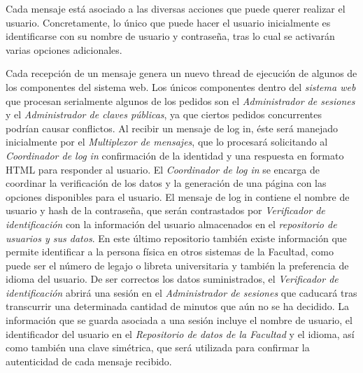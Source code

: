 Cada mensaje está asociado a las diversas acciones que puede querer realizar el usuario. Concretamente, lo único que puede hacer el usuario inicialmente es identificarse con su nombre de usuario y contraseña, tras lo cual se activarán varias opciones adicionales.


Cada recepción de un mensaje genera un nuevo thread de ejecución de algunos de los componentes del sistema web. Los únicos componentes dentro del \emph{sistema web} que procesan serialmente algunos de los pedidos son el  \emph{Administrador de sesiones} y el \emph{Administrador de claves públicas}, ya que ciertos pedidos concurrentes podrían causar conflictos.
Al recibir un mensaje de log in, éste será manejado inicialmente por el \emph{Multiplexor de mensajes}, que lo procesará solicitando al \emph{Coordinador de log in} confirmación de la identidad y una respuesta en formato HTML para responder al usuario. El \emph{Coordinador de log in} se encarga de coordinar la verificación de los datos y la generación de una página con las opciones disponibles para el usuario. 
El mensaje de log in contiene el nombre de usuario y hash de la contraseña, que serán contrastados por \emph{Verificador de identificación} con la información del usuario almacenados en el \emph{repositorio de usuarios y sus datos}. En este último repositorio también existe información que permite identificar a la persona física en otros sistemas de la Facultad, como puede ser el número de legajo o libreta universitaria y también la preferencia de idioma del usuario. 
De ser correctos los datos suministrados, el \emph{Verificador de identificación} abrirá una sesión en el \emph{Administrador de sesiones} que caducará tras transcurrir una determinada cantidad de minutos que aún no se ha decidido.
La información que se guarda asociada a una sesión incluye el nombre de usuario, el identificador del usuario en el \emph{Repositorio de datos de la Facultad} y el idioma, así como también una clave simétrica, que será utilizada para confirmar la autenticidad de cada mensaje recibido.  
